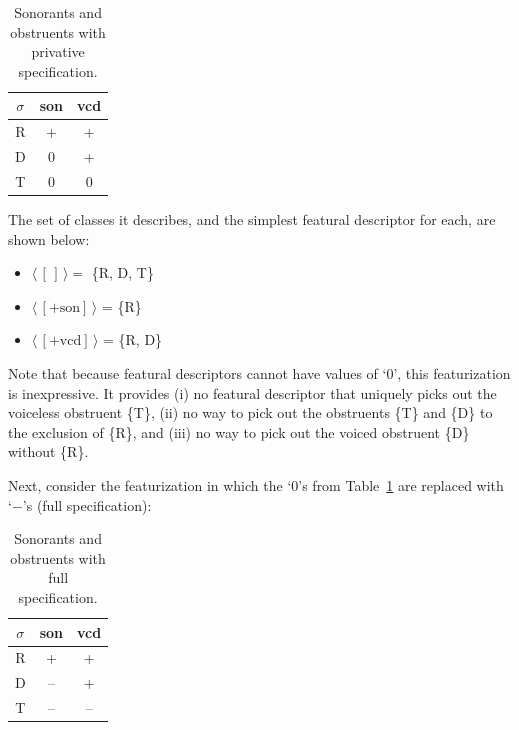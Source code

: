\documentclass[11pt, oneside]{article}   	%
\begin{document}
\begin{table}[h]
    \centering
    \begin{tabular} {|c||c|c|}
    \hline
        $\sigma$ & son & vcd \\ \hline
        R & + & + \\
        D & 0 & + \\
        T & 0 & 0 \\
        \hline
    \end{tabular}
    \caption{Sonorants and obstruents with privative specification.}
    \label{table:privative}
\end{table}

\noindent The set of classes it describes, and the simplest featural descriptor for each, are shown below: \begin{itemize}
  \item $\langle \, [\,] \, \rangle = $ \{R, D, T\}
  \item $\langle \, [+\text{son}] \, \rangle$ = \{R\}
  \item $\langle \, [+\text{vcd}] \, \rangle$ = \{R, D\}
  \end{itemize}
  
\noindent Note that because featural descriptors cannot have values of `0', this featurization is inexpressive. It provides (i) no featural descriptor that uniquely picks out the voiceless obstruent \{T\}, (ii) no way to pick out the obstruents \{T\} and \{D\} to the exclusion of \{R\}, and (iii) no way to pick out the voiced obstruent \{D\} without \{R\}.

Next, consider the featurization in which the `$0$'s from Table~\ref{table:privative} are replaced with `$-$'s (full specification):

\begin{table}[h]
    \centering
    \begin{tabular} {|c||c|c|}
    \hline
        $\sigma$ & son & vcd \\ \hline
        R & + & + \\
        D & -- & + \\
        T & -- & -- \\
        \hline
    \end{tabular}
    \caption{Sonorants and obstruents with full specification.}
    \label{table:full}
\end{table}
\end{document}
